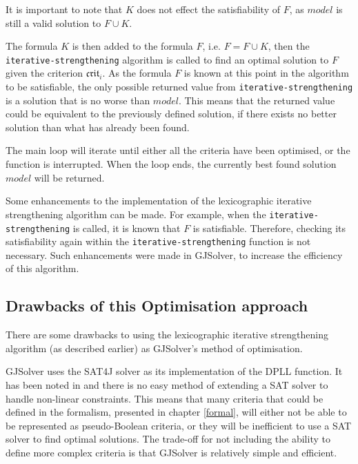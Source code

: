It is important to note that $K$ does not effect the satisfiability of $F$, as $model$ is still a valid solution to $F \cup K$.

The formula $K$ is then added to the formula $F$, i.e. $F = F \cup K$,
then the \texttt{iterative-strengthening} algorithm is called to find an optimal solution to $F$ given the criterion $\mathfrak{crit}_i$.
As the formula $F$ is known at this point in the algorithm to be satisfiable, the only possible returned value from \texttt{iterative-strengthening}
is a solution that is no worse than $model$.
This means that the returned value could be equivalent to the previously defined solution, if there exists no better solution than what has already been found.

The main loop will iterate until either all the criteria have been optimised, or the function is interrupted.
When the loop ends, the currently best found solution $model$ will be returned.

Some enhancements to the implementation of the lexicographic iterative strengthening algorithm can be made.
For example, when the \texttt{iterative-strengthening} is called, it is known that $F$ is satisfiable. 
Therefore, checking its satisfiability again within the \texttt{iterative-strengthening} function is not necessary.
Such enhancements were made in GJSolver, to increase the efficiency of this algorithm. 

\subsection{Drawbacks of this Optimisation approach}
There are some drawbacks to using the lexicographic iterative strengthening algorithm (as described earlier) 
as GJSolver's method of optimisation.

GJSolver uses the SAT4J solver as its implementation of the DPLL function. 
It has been noted in \citep{le_berre_dependency_2009} and \citep{leBerre2010} there is no easy method of extending a SAT solver to handle non-linear constraints.
This means that many criteria that could be defined in the formalism, presented in chapter \ref{formal}, will either not be able to be represented as pseudo-Boolean criteria, 
or they will be inefficient to use a SAT solver to find optimal solutions.  
The trade-off for not including the ability to define more complex criteria is that GJSolver is relatively simple and efficient. 

